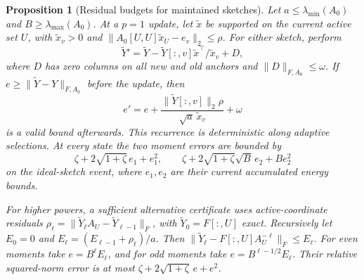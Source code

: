 \documentclass[11pt]{article}
\newtheorem{proposition}[theorem]{Proposition}
\begin{document}
\begin{proposition}[Residual budgets for maintained sketches]
\label{prop:sketchresidual}
Let $a\leq\lambda_{\min}(A_0)$ and
$B\geq\lambda_{\max}(A_0)$. At a $p=1$ update, let
$\widetilde x$ be supported on the current active set $U$, with
$\widetilde x_v>0$ and
$\|A_0[U,U]\widetilde x_U-e_v\|_2\leq\rho$.
For either sketch, perform
\[
 \widetilde Y'=
 \widetilde Y-\widetilde Y[:,v]\widetilde x^\top/
                 \widetilde x_v+D,
\]
where $D$ has zero columns on all new and old anchors and
$\|D\|_{F,A_0}\leq\omega$.
If $e\geq\|\widetilde Y-Y\|_{F,A_0}$ before the update, then
\begin{equation}\label{eq:sketchresidual}
 e'=e+\frac{\|\widetilde Y[:,v]\|_2\rho}
                   {\sqrt a\,\widetilde x_v}+\omega
\end{equation}
is a valid bound afterwards. This recurrence is deterministic
along adaptive selections. At every state the two moment errors
are bounded by
\[
 \zeta+2\sqrt{1+\zeta}\,e_1+e_1^2,\qquad
 \zeta+2\sqrt{1+\zeta}\sqrt B\,e_2+B e_2^2
\]
on the ideal-sketch event, where $e_1,e_2$ are their current
accumulated energy bounds.

For higher powers, a sufficient alternative certificate uses
active-coordinate residuals
$\rho_\ell=\|\widetilde Y_\ell A_U-\widetilde Y_{\ell-1}\|_F$,
with $\widetilde Y_0=F[:,U]$ exact. Recursively let
$E_0=0$ and $E_\ell=(E_{\ell-1}+\rho_\ell)/a$.
Then $\|\widetilde Y_\ell-F[:,U]A_U^{-\ell}\|_F\leq E_\ell$.
For even moments take $e=B^\ell E_\ell$, and for odd moments
take $e=B^{\ell-1/2}E_\ell$. Their relative squared-norm error
is at most $\zeta+2\sqrt{1+\zeta}\,e+e^2$.
\end{proposition}
\end{document}
